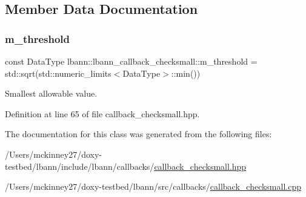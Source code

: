 \subsection{Member Data Documentation}
\mbox{\label{classlbann_1_1lbann__callback__checksmall_a2c37cd93bca10f6fb42348c2e6b0016e}} 
\subsubsection{\texorpdfstring{m\+\_\+threshold}{m\_threshold}}
{\footnotesize\ttfamily const Data\+Type lbann\+::lbann\+\_\+callback\+\_\+checksmall\+::m\+\_\+threshold = std\+::sqrt(std\+::numeric\+\_\+limits$<$Data\+Type$>$\+::min())\hspace{0.3cm}{\ttfamily [private]}}

Smallest allowable value. 

Definition at line 65 of file callback\+\_\+checksmall.\+hpp.



The documentation for this class was generated from the following files\+:\begin{DoxyCompactItemize}
\item 
/\+Users/mckinney27/doxy-\/testbed/lbann/include/lbann/callbacks/\hyperlink{callback__checksmall_8hpp}{callback\+\_\+checksmall.\+hpp}\item 
/\+Users/mckinney27/doxy-\/testbed/lbann/src/callbacks/\hyperlink{callback__checksmall_8cpp}{callback\+\_\+checksmall.\+cpp}\end{DoxyCompactItemize}
